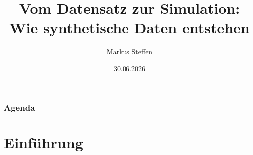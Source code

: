 \documentclass[
	11pt, %
]{beamer}
\title[Synthetische Daten]{Vom Datensatz zur Simulation: Wie synthetische Daten entstehen}
\author[Markus Steffen]{Markus Steffen}
\date[30.06.2026]{30.06.2026}
\begin{document}

\begin{frame}
    \titlepage
\end{frame}


\begin{frame}
    \frametitle{Agenda}
    \tableofcontents
\end{frame}

\section{Einführung}
\end{document}
